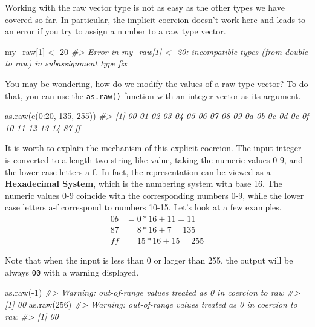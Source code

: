 \documentclass[
]{book}
\newenvironment{Shaded}{\begin{snugshade}}{\end{snugshade}}
\newcommand{\CommentTok}[1]{\textcolor[rgb]{0.56,0.35,0.01}{\textit{#1}}}
\newcommand{\DecValTok}[1]{\textcolor[rgb]{0.00,0.00,0.81}{#1}}
\newcommand{\FunctionTok}[1]{\textcolor[rgb]{0.00,0.00,0.00}{#1}}
\newcommand{\NormalTok}[1]{#1}
\newcommand{\OtherTok}[1]{\textcolor[rgb]{0.56,0.35,0.01}{#1}}
\newcommand{\SpecialCharTok}[1]{\textcolor[rgb]{0.00,0.00,0.00}{#1}}
\begin{document}
Working with the raw vector type is not as easy as the other types we have covered so far. In particular, the implicit coercion doesn't work here and leads to an error if you try to assign a number to a raw type vector.

\begin{Shaded}
\begin{Highlighting}[]
\NormalTok{my\_raw[}\DecValTok{1}\NormalTok{] }\OtherTok{\textless{}{-}} \DecValTok{20}
\CommentTok{\#\textgreater{} Error in my\_raw[1] \textless{}{-} 20: incompatible types (from double to raw) in subassignment type fix}
\end{Highlighting}
\end{Shaded}

You may be wondering, how do we modify the values of a raw type vector? To do that, you can use the \texttt{as.raw()} function with an integer vector as its argument.

\begin{Shaded}
\begin{Highlighting}[]
\FunctionTok{as.raw}\NormalTok{(}\FunctionTok{c}\NormalTok{(}\DecValTok{0}\SpecialCharTok{:}\DecValTok{20}\NormalTok{, }\DecValTok{135}\NormalTok{, }\DecValTok{255}\NormalTok{))}
\CommentTok{\#\textgreater{}  [1] 00 01 02 03 04 05 06 07 08 09 0a 0b 0c 0d 0e 0f 10 11 12 13 14 87 ff}
\end{Highlighting}
\end{Shaded}

It is worth to explain the mechanism of this explicit coercion. The input integer is converted to a length-two string-like value, taking the numeric values 0-9, and the lower case letters a-f.~In fact, the representation can be viewed as a \textbf{Hexadecimal System}, which is the numbering system with base 16. The numeric values 0-9 coincide with the corresponding numbers 0-9, while the lower case letters a-f correspond to numbers 10-15. Let's look at a few examples.
\begin{align}
0b &= 0*16 + 11 = 11\\
87 &= 8*16 + 7 = 135\\
ff &= 15*16 + 15 = 255
\end{align}

Note that when the input is less than 0 or larger than 255, the output will be always \texttt{00} with a warning displayed.

\begin{Shaded}
\begin{Highlighting}[]
\FunctionTok{as.raw}\NormalTok{(}\SpecialCharTok{{-}}\DecValTok{1}\NormalTok{)}
\CommentTok{\#\textgreater{} Warning: out{-}of{-}range values treated as 0 in coercion to raw}
\CommentTok{\#\textgreater{} [1] 00}
\FunctionTok{as.raw}\NormalTok{(}\DecValTok{256}\NormalTok{)}
\CommentTok{\#\textgreater{} Warning: out{-}of{-}range values treated as 0 in coercion to raw}
\CommentTok{\#\textgreater{} [1] 00}
\end{Highlighting}
\end{Shaded}
\end{document}
